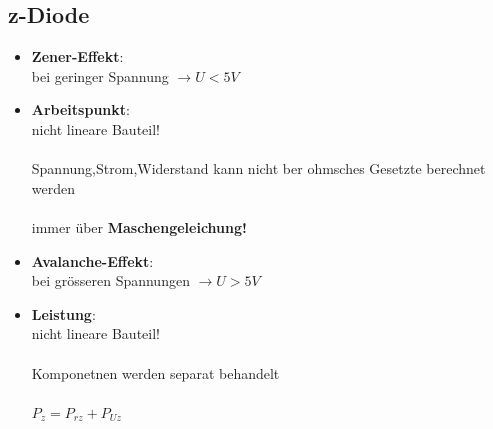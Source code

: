 \documentclass[a4paper,12pt]{article}
\begin{document}
    \subsection{z-Diode}
    \begin{minipage}[t]{0.5\columnwidth}
        \begin{itemize}[label={}, leftmargin=*,  itemsep=0.1em]
            \item \textbf{Zener-Effekt}: \\ bei geringer Spannung $\rightarrow U < 5V$
            \item \textbf{Arbeitspunkt}: \\ nicht lineare Bauteil! \\ \\ Spannung,Strom,Widerstand kann nicht ber ohmsches Gesetzte berechnet werden \\  \\ immer über \textbf{Maschengeleichung!}
        \end{itemize}
    \end{minipage}\hfill
    \begin{minipage}[t]{0.5\columnwidth}
        \begin{itemize}[label={}, leftmargin=*]
            \item \textbf{Avalanche-Effekt}: \\ bei grösseren Spannungen $\rightarrow U > 5V$
            \item \textbf{Leistung}: \\  nicht lineare Bauteil! \\ \\ Komponetnen werden separat behandelt \\ \\ $P_z = P_{rz} + P_{Uz}$
        \end{itemize}
    \end{minipage}\hfill
    
\end{document}
